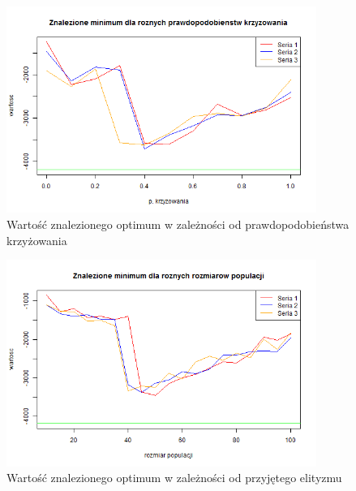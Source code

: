 \documentclass[11pt, a4paper]{article}
\begin{document}
\begin{figure}[H]
	\begin{center}
		\includegraphics[width=0.9\textwidth]{./assets/Schwefel3.png} %
		\caption{Wartość znalezionego optimum w zależności od prawdopodobieństwa krzyżowania}
		\label{fig:schwefel3}
	\end{center}
\end{figure}

\begin{figure}[H]
	\begin{center}
		\includegraphics[width=0.9\textwidth]{./assets/Schwefel4.png} %
		\caption{Wartość znalezionego optimum w zależności od przyjętego elityzmu}
		\label{fig:schwefel4}
	\end{center}
\end{figure}
\end{document}
